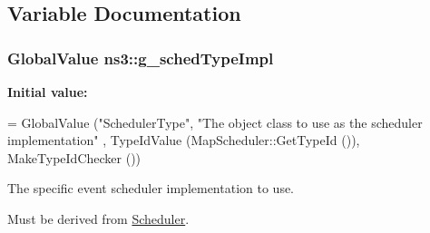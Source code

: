 \subsection{Variable Documentation}
\subsubsection[{\texorpdfstring{g\+\_\+sched\+Type\+Impl}{g_schedTypeImpl}}]{\setlength{\rightskip}{0pt plus 5cm}Global\+Value ns3\+::g\+\_\+sched\+Type\+Impl\hspace{0.3cm}{\ttfamily [static]}}\hypertarget{group__scheduler_ga8af85a17944949f1274576b38863d8f0}{}\label{group__scheduler_ga8af85a17944949f1274576b38863d8f0}
{\bfseries Initial value\+:}
\begin{DoxyCode}
= GlobalValue (\textcolor{stringliteral}{"SchedulerType"},
                                                  \textcolor{stringliteral}{"The object class to use as the scheduler implementation"}
      ,
                                                  TypeIdValue (MapScheduler::GetTypeId ()),
                                                  MakeTypeIdChecker ())
\end{DoxyCode}
The specific event scheduler implementation to use.

Must be derived from \hyperlink{classns3_1_1Scheduler}{Scheduler}. 